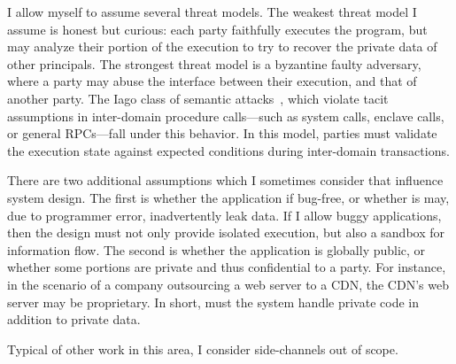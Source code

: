 I allow myself to assume several threat models.
%
The weakest threat model I assume is honest but curious: each party faithfully
executes the program, but may analyze their portion of the execution to try to
recover the private data of other principals.
%
The strongest threat model is a byzantine faulty adversary, where a party may
abuse the interface between their execution, and that of another party.
%
The Iago class of semantic attacks~\cite{iago-attacks}, which violate
tacit assumptions in inter-domain procedure calls---such as system calls,
enclave calls, or general RPCs---fall under this behavior.
%
In this model, parties must validate the execution state against expected
conditions during inter-domain transactions.


There are two additional assumptions which I sometimes consider that
influence system design.
%
The first is whether the application if bug-free, or whether is may, due to
programmer error, inadvertently leak data.
%
If I allow buggy applications, then the design must not only provide isolated
execution, but also a sandbox for information flow.
%
The second is whether the application is globally public, or whether some
portions are private and thus confidential to a party. 
%
For instance, in the scenario of a company outsourcing a web server to a CDN,
the CDN's web server may be proprietary.
%
In short, must the system handle private code in addition to private data.


Typical of other work in this area, I consider side-channels out of scope.
